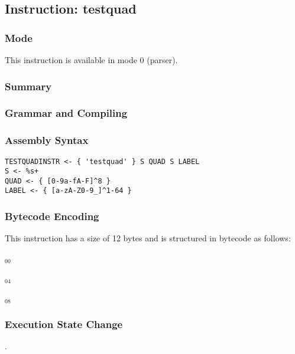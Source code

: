 \subsection{Instruction: testquad}

\subsubsection{Mode}
This instruction is available in mode 0 (parser).
\subsubsection{Summary}


\subsubsection{Grammar and Compiling}


\subsubsection{Assembly Syntax}

\begin{myquote}
\begin{verbatim}
TESTQUADINSTR <- { 'testquad' } S QUAD S LABEL
S <- %s+
QUAD <- { [0-9a-fA-F]^8 }
LABEL <- { [a-zA-Z0-9_]^1-64 }
\end{verbatim}
\end{myquote}

\subsubsection{Bytecode Encoding}

This instruction has a size of 12 bytes and is structured in bytecode as follows:

$_{00}$\ 



$_{04}$\ 



$_{08}$\ 
\fbox{%
  \parbox{20pt}{%
00
  }%
}


\subsubsection{Execution State Change}

.


